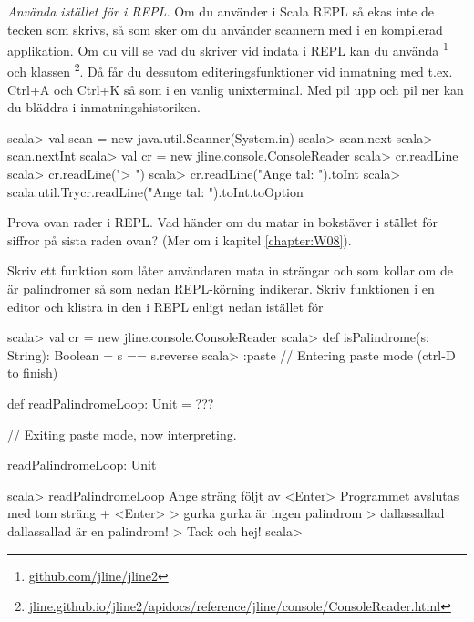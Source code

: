 \Task \emph{Använda  istället för  i REPL.} Om du använder   i Scala REPL så ekas inte de tecken som skrivs, så som sker om du använder scannern med  i en kompilerad applikation. Om du vill se vad du skriver vid indata i REPL kan du använda \footnote{
\href{https://github.com/jline/jline2}{github.com/jline/jline2}
} och klassen \footnote{
\href{http://jline.github.io/jline2/apidocs/reference/jline/console/ConsoleReader.html}{jline.github.io/jline2/apidocs/reference/jline/console/ConsoleReader.html}}.
Då får du dessutom editeringsfunktioner vid inmatning med t.ex. Ctrl+A och Ctrl+K så som i en vanlig unixterminal. Med pil upp och pil ner kan du bläddra i inmatningshistoriken.
\begin{REPL}
scala> val scan = new java.util.Scanner(System.in)
scala> scan.next
scala> scan.nextInt
scala> val cr = new jline.console.ConsoleReader
scala> cr.readLine
scala> cr.readLine("> ")
scala> cr.readLine("Ange tal: ").toInt
scala> scala.util.Try{cr.readLine("Ange tal: ").toInt}.toOption
\end{REPL}

\Subtask Prova ovan rader i REPL. Vad händer om du matar in bokstäver i stället för siffror på sista raden ovan? (Mer om  i kapitel \ref{chapter:W08}).

\Subtask Skriv ett funktion  som låter användaren mata in strängar och som kollar om de är palindromer så som nedan REPL-körning indikerar. Skriv funktionen i en editor och klistra in den i REPL enligt nedan istället för 

\begin{REPL}
scala> val cr = new jline.console.ConsoleReader
scala> def isPalindrome(s: String): Boolean = s == s.reverse
scala> :paste
// Entering paste mode (ctrl-D to finish)

def readPalindromeLoop: Unit = ???

// Exiting paste mode, now interpreting.

readPalindromeLoop: Unit

scala> readPalindromeLoop
Ange sträng följt av <Enter>
Programmet avslutas med tom sträng + <Enter>
> gurka
gurka är ingen palindrom
> dallassallad
dallassallad är en palindrom!
>
Tack och hej!
scala>
\end{REPL}

